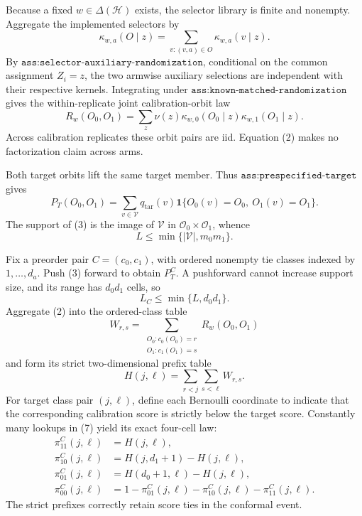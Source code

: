 Because a fixed \(w\in\Delta(\mathcal H)\) exists, the selector library is finite and nonempty. Aggregate the implemented selectors by
\[
\kappa_{w,a}(O\mid z)
=
\sum_{v:(v,a)\in O}\kappa_{w,a}(v\mid z).
\tag{1}
\]
By \(\texttt{ass:selector-auxiliary-randomization}\), conditional on the common assignment \(Z_i=z\), the two armwise auxiliary selections are independent with their respective kernels. Integrating under \(\texttt{ass:known-matched-randomization}\) gives the within-replicate joint calibration-orbit law
\[
R_w(O_0,O_1)
=
\sum_z\nu(z)\kappa_{w,0}(O_0\mid z)\kappa_{w,1}(O_1\mid z).
\tag{2}
\]
Across calibration replicates these orbit pairs are iid. Equation (2) makes no factorization claim across arms.

Both target orbits lift the same target member. Thus \(\texttt{ass:prespecified-target}\) gives
\[
P_T(O_0,O_1)
=
\sum_{v\in\mathcal V}q_{\mathrm{tar}}(v)
\mathbf 1\{O_0(v)=O_0,\ O_1(v)=O_1\}.
\tag{3}
\]
The support of (3) is the image of \(\mathcal V\) in \(\mathcal O_0\times\mathcal O_1\), whence
\[
L\le\min\{|\mathcal V|,m_0m_1\}.
\tag{4}
\]

Fix a preorder pair \(C=(c_0,c_1)\), with ordered nonempty tie classes indexed by \(1,\ldots,d_a\). Push (3) forward to obtain \(P_T^C\). A pushforward cannot increase support size, and its range has \(d_0d_1\) cells, so
\[
L_C\le\min\{L,d_0d_1\}.
\tag{5}
\]
Aggregate (2) into the ordered-class table
\[
W_{r,s}
=
\sum_{\substack{O_0:c_0(O_0)=r\\O_1:c_1(O_1)=s}}
R_w(O_0,O_1)
\tag{6}
\]
and form its strict two-dimensional prefix table
\[
H(j,\ell)=\sum_{r<j}\sum_{s<\ell}W_{r,s}.
\tag{7}
\]
For target class pair \((j,\ell)\), define each Bernoulli coordinate to indicate that the corresponding calibration score is strictly below the target score. Constantly many lookups in (7) yield its exact four-cell law:
\[
\begin{aligned}
\pi^C_{11}(j,\ell)&=H(j,\ell),\\
\pi^C_{10}(j,\ell)&=H(j,d_1+1)-H(j,\ell),\\
\pi^C_{01}(j,\ell)&=H(d_0+1,\ell)-H(j,\ell),\\
\pi^C_{00}(j,\ell)&=1-\pi^C_{01}(j,\ell)-\pi^C_{10}(j,\ell)-\pi^C_{11}(j,\ell).
\end{aligned}
\tag{8}
\]
The strict prefixes correctly retain score ties in the conformal event.

